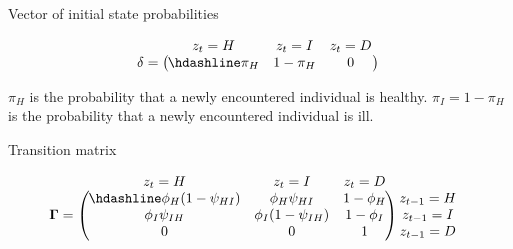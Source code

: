 \documentclass[
  12pt,
]{krantz}
\begin{document}
Vector of initial state probabilities

\[
\begin{matrix}
& \\
\mathbf{\delta} =
    \left ( \vphantom{ \begin{matrix} 12 \end{matrix} } \right .
\end{matrix}
\hspace{-1.2em}
\begin{matrix}
    z_t=H & z_t=I & z_t=D \\ \hdashline
\pi_H & 1 - \pi_{H} & 0\\
\end{matrix}
\hspace{-0.2em}
\begin{matrix}
& \\
\left . \vphantom{ \begin{matrix} 12 \end{matrix} } \right )
    \begin{matrix}
    \end{matrix}
\end{matrix}
\]

\(\pi_H\) is the probability that a newly encountered individual is healthy. \(\pi_{I} = 1 - \pi_H\) is the probability that a newly encountered individual is ill.

Transition matrix

\[
\begin{matrix}
& \\
\mathbf{\Gamma} =
    \left ( \vphantom{ \begin{matrix} 12 \\ 12 \\ 12 \end{matrix} } \right .
\end{matrix}
\hspace{-1.2em}
\begin{matrix}
    z_t=H & z_t=I & z_t=D \\ \hdashline
\phi_H (1-\psi_{HI}) & \phi_H \psi_{HI} & 1 - \phi_H\\
\phi_{I} \psi_{IH} & \phi_{I} (1-\psi_{IH}) & 1 - \phi_{I}\\
0 & 0 & 1
\end{matrix}
\hspace{-0.2em}
\begin{matrix}
& \\
\left . \vphantom{ \begin{matrix} 12 \\ 12 \\ 12 \end{matrix} } \right )
    \begin{matrix}
    z_{t-1}=H \\ z_{t-1}=I \\ z_{t-1}=D
    \end{matrix}
\end{matrix}
\]
\end{document}
